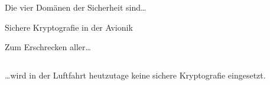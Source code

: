 
\begin{frame}{Die vier Domänen der Sicherheit sind…}
\end{frame}



\begin{frame}[c]{Sichere Kryptografie in der Avionik}
\end{frame}

\begin{frame}[c]{Zum Erschrecken aller…}
  \begin{columns}[fullwidth,c]
    \begin{column}{.5\linewidth}

        \footnotesize
        …wird in der Luftfahrt heutzutage keine sichere Kryptografie eingesetzt. 
    \end{column}%
    \hfill
  \end{columns}
\end{frame}


